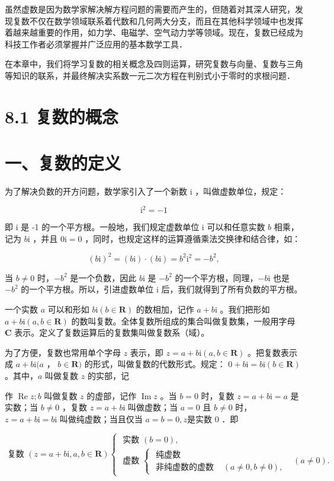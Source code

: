 \documentclass[10pt]{article}
\begin{document}
虽然虚数是因为数学家解决解方程问题的需要而产生的，但随着对其深人研究，发现复数不仅在数学领域联系着代数和几何两大分支，而且在其他科学领域中也发挥着越来越重要的作用，如力学、电磁学、空气动力学等领域。现在，复数已经成为科技工作者必须掌握并广泛应用的基本数学工具．

在本章中，我们将学习复数的相关概念及四则运算，研究复数与向量、复数与三角等知识的联系，并最终解决实系数一元二次方程在判别式小于零时的求根问题．

\section*{8.1 复数的概念}
\section*{一、复数的定义}
为了解决负数的开方问题，数学家引入了一个新数 i ，叫做虚数单位，规定：

\[
\mathrm{i}^{2}=-1
\]

即 i 是 -1 的一个平方根。一般地，我们规定虚数单位 i 可以和任意实数 \(b\) 相乘，记为 \(b \mathrm{i}\) ，并且 \(0 \mathrm{i}=0\) ，同时，也规定这样的运算遵循乘法交换律和结合律，如：

\[
(b \mathrm{i})^{2}=(b \mathrm{i}) \cdot(b \mathrm{i})=b^{2} \mathrm{i}^{2}=-b^{2},
\]

当 \(b \neq 0\) 时，\(-b^{2}\) 是一个负数，因此 \(b \mathrm{i}\) 是 \(-b^{2}\) 的一个平方根，同理，\(-b \mathrm{i}\) 也是 \(-b^{2}\) 的一个平方根。所以，引进虚数单位 i 后，我们就得到了所有负数的平方根。

一个实数 \(a\) 可以和形如 \(b \mathrm{i}(b \in \mathbf{R})\) 的数相加，记作 \(a+b \mathrm{i}\) 。我们把形如 \(a+b \mathrm{i}(a, b \in \mathbf{R})\) 的数叫复数。全体复数所组成的集合叫做复数集，一般用字母 \(\mathbf{C}\) 表示。定义了复数运算后的复数集叫做复数系（域）。

为了方便，复数也常用单个字母 \(z\) 表示，即 \(z=a+b \mathrm{i}(a, b \in \mathbf{R})\) 。把复数表示成 \(a+b \mathrm{i}(a\) ， \(b \in \mathbf{R})\) 的形式，叫做复数的代数形式。规定： \(0+b \mathrm{i}=b \mathrm{i}(b \in \mathbf{R})\) 。其中，\(a\) 叫做复数 \(z\) 的实部，记

作 \(\operatorname{Re} z ; b\) 叫做复数 \(z\) 的虚部，记作 \(\operatorname{Im} z\) 。当 \(b=0\) 时，复数 \(z=a+b \mathrm{i}=a\) 是实数；当 \(b \neq 0\) ，复数 \(z=a+b \mathrm{i}\) 叫做虚数；当 \(a=0\) 且 \(b \neq 0\) 时，\(z=a+b \mathrm{i}=b \mathrm{i}\) 叫做纯虚数；当且仅当 \(a=b=0, z\)是实数 0 ．即

\[
\text { 复数 }(z=a+b \mathrm{i}, a, b \in \mathbf{R}) \begin{cases}\text { 实数 }(b=0), & \\ \text { 虚数 } \begin{cases}\text { 纯虚数 } & \\ \text { 非纯虚数的虚数 } & (a \neq 0, b \neq 0),\end{cases} & (a \neq 0) .\end{cases}
\]
\end{document}
